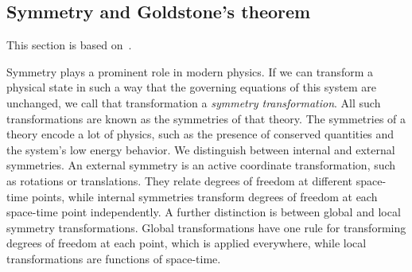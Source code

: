 \subsection{Symmetry and Goldstone's theorem}
\label{section: symmetry and goldstone's theorem}

This section is based on~\autocite{leeIntroductionSmoothManifolds2003d,peskinIntroductionQuantumField1995,schwartzQuantumFieldTheory2013,weinbergQuantumTheoryFields1995,weinbergQuantumTheoryFields1996}.

Symmetry plays a prominent role in modern physics.
If we can transform a physical state in such a way that the governing equations of this system are unchanged, we call that transformation a \emph{symmetry transformation}.
All such transformations are known as the symmetries of that theory.
The symmetries of a theory encode a lot of physics, such as the presence of conserved quantities and the system's low energy behavior.
We distinguish between internal and external symmetries.
An external symmetry is an active coordinate transformation, such as rotations or translations.
They relate degrees of freedom at different space-time points, while internal symmetries transform degrees of freedom at each space-time point independently.
A further distinction is between global and local symmetry transformations.
Global transformations have one rule for transforming degrees of freedom at each point, which is applied everywhere, while local transformations are functions of space-time.

